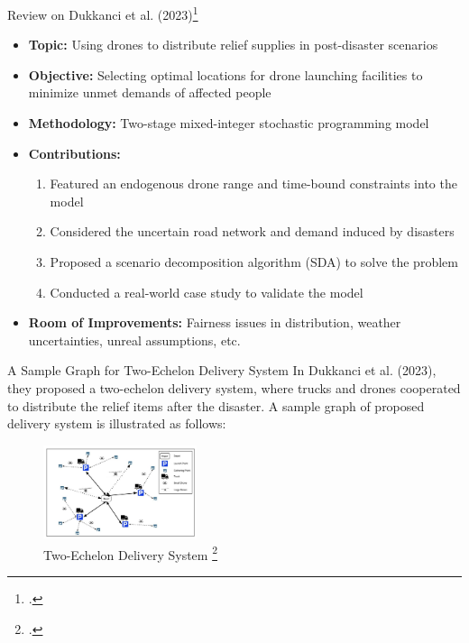 \documentclass[aspectratio=169]{beamer}
\begin{document}
\begin{frame}{Review on Dukkanci et al. (2023)\footcite{dukkanci2023drones}}
  \begin{itemize}
    \item \textbf{Topic:} Using drones to distribute relief supplies in post-disaster scenarios
    \item \textbf{Objective:} Selecting optimal locations for drone launching facilities to minimize unmet demands of affected people
    \item \textbf{Methodology:} Two-stage mixed-integer stochastic programming model
    \item \textbf{Contributions:} 
      \begin{enumerate}[label=\arabic*.]
        \item Featured an endogenous drone range and time-bound constraints into the model
        \item Considered the uncertain road network and demand induced by disasters
        \item Proposed a scenario decomposition algorithm (SDA) to solve the problem
        \item Conducted a real-world case study to validate the model
      \end{enumerate}
    \item \textbf{Room of Improvements:} Fairness issues in distribution, weather uncertainties, unreal assumptions, etc.
  \end{itemize}
\end{frame}

\begin{frame}{A Sample Graph for Two-Echelon Delivery System}
    In Dukkanci et al. (2023), they proposed a two-echelon delivery system, where trucks and drones cooperated to distribute the relief items after the disaster. A sample graph of proposed delivery system is illustrated as follows:
    \begin{figure}[h]
        \centering
        \includegraphics[width=0.4\textwidth]{Drone_delivery_system.png}
        \caption{Two-Echelon Delivery System \footcite{dukkanci2023drones}}
        \label{fig:delivery_system}
    \end{figure}
    
\end{frame}
\end{document}
